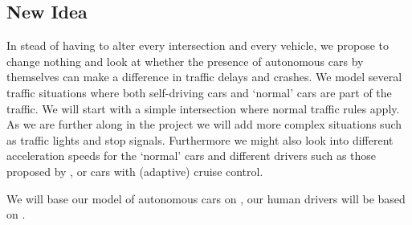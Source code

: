 \subsection{New Idea}
\label{sub:intro:new_idea}

In stead of having to alter every intersection and every vehicle, we propose to change nothing and look at whether the presence of autonomous cars by themselves can make a difference in traffic delays and crashes. 
We model several traffic situations where both self-driving cars and `normal' cars are part of the traffic. We will start with a simple intersection where normal traffic rules apply. As we are further along in the project we will add more complex situations such as traffic lights and stop signals. Furthermore we might also look into different acceleration speeds for the `normal' cars and different drivers such as those proposed by \textcite{paruchuri2002multi}, or cars with (adaptive) cruise control.

We will base our model of autonomous cars on \textcite{jiang2010microscopic}, our human drivers will be based on \textcite{paruchuri2002multi}.











